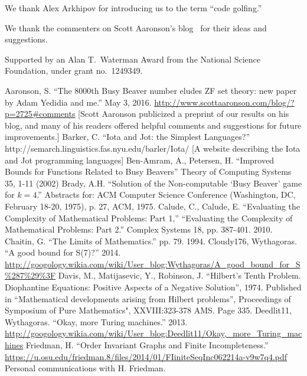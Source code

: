 \documentclass[11pt]{article}
\begin{document}
We thank Alex Arkhipov for introducing us to the term ``code golfing.''

We thank the commenters on Scott Aaronson's blog~\cite{comments} for their ideas and suggestions.

Supported by an Alan T.\ Waterman Award from the National Science Foundation, under grant no.\ 1249349.

\begin{thebibliography}{100}
 Aaronson, S. ``The 8000th Busy Beaver number eludes ZF set theory: new paper by Adam Yedidia and me.'' May 3, 2016. \url{http://www.scottaaronson.com/blog/?p=2725#comments} [Scott Aaronson publicized a preprint of our results on his blog, and many of his readers offered helpful comments and suggestions for future improvements.]
 Barker, C. ``Iota and Jot: the Simplest Languages?''
http://semarch.linguistics.fas.nyu.edu/barler/Iota/
[A website describing the Iota and Jot programming languages]
 Ben-Amram, A., Petersen, H. ``Improved Bounds for Functions Related to Busy Beavers'' Theory of Computing Systems 35, 1-11 (2002)
 Brady, A.H. ``Solution of the Non-computable `Busy Beaver' game for $k=4$.'' Abstracts for: ACM Computer Science Conference (Washington, DC, February 18-20, 1975), p. 27, ACM, 1975.
 Calude, C., Calude, E. ``Evaluating the Complexity of Mathematical Problems: Part 1,'' ``Evaluating the Complexity of Mathematical Problems: Part 2.'' Complex Systems 18, pp. 387-401. 2010.
 Chaitin, G. ``The Limits of Mathematics.'' pp. 79. 1994.
 Cloudy176, Wythagoras. ``A good bound for S(7)?'' 2014. \url{http://googology.wikia.com/wiki/User_blog:Wythagoras/A_good_bound_for_S%287%29%3F}
 Davis, M., Matijasevic, Y., Robinson, J. ``Hilbert's Tenth Problem. Diophantine Equations: Positive Aspects of a Negative Solution'', 1974. Published in ``Mathematical developments arising from Hilbert problems'', Proceedings of Symposium of Pure Mathematics", XXVIII:323-378 AMS. Page 335.
 Deedlit11, Wythagoras. ``Okay, more Turing machines.'' 2013.
\url{http://googology.wikia.com/wiki/User_blog:Deedlit11/Okay,_more_Turing_machines}
 Friedman, H. ``Order Invariant Graphs and Finite Incompleteness.'' \url{https://u.osu.edu/friedman.8/files/2014/01/FIiniteSeqInc062214a-v9w7q4.pdf}
 Personal communications with H. Friedman.

\end{thebibliography}
\end{document}
